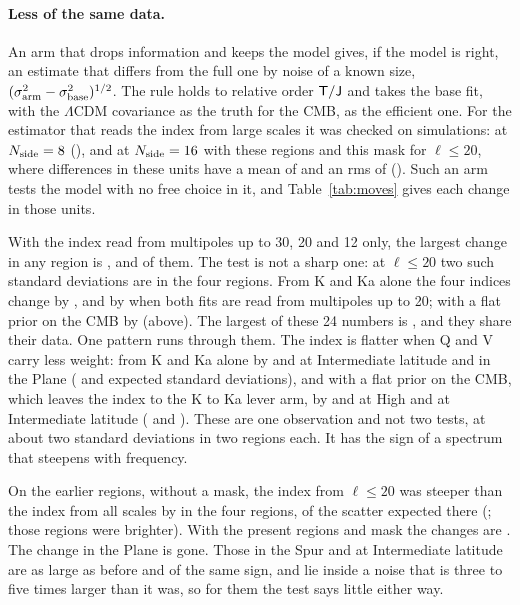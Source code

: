 \paragraph{Less of the same data.} An arm that drops information and keeps the model gives, if the
model is right, an estimate that differs from the full one by noise of a known size,
$(\sigma_{\rm arm}^2 - \sigma_{\rm base}^2)^{1/2}$. The rule holds to relative order $\mathsf{T}/\mathsf{J}$ and takes
the base fit, with the $\Lambda$CDM covariance as the truth for the CMB, as the efficient one. For
the estimator that reads the index from large scales it was checked on simulations: at
$N_{\rm side}=8$ (), and at $N_{\rm side}=16$ with these regions and this mask for
$\ell \le 20$, where  differences in these units have a mean of  and
an rms of  (). Such an arm tests the model with no free choice in it,
and Table~\ref{tab:moves} gives each change in those units.

With the index read from multipoles up to 30, 20 and 12 only, the largest change in any region is
,  and  of them. The test is not a sharp one: at
$\ell \le 20$ two such standard deviations are  in the four regions. From K and
Ka alone the four indices change by , and by  when both fits
are read from multipoles up to 20; with a flat prior on the CMB by  (above).
The largest of these 24 numbers is , and they share their data. One pattern runs
through them. The index is flatter when Q and V carry less weight: from K and Ka alone by
 and  at Intermediate latitude and in the Plane (
and  expected standard deviations), and with a flat prior on the CMB, which leaves
the index to the K to Ka lever arm, by  and  at High and at
Intermediate latitude ( and ). These are one observation and
not two tests, at about two standard deviations in two regions each. It has the sign of a spectrum
that steepens with frequency.

On the earlier regions, without a mask, the index from $\ell \le 20$ was steeper than the index
from all scales by  in the four regions,  of the
scatter expected there (; those regions were brighter). With the present
regions and mask the changes are . The change in the Plane is gone. Those in the
Spur and at Intermediate latitude are as large as before and of the same sign, and lie inside a
noise that is three to five times larger than it was, so for them the test says little either way.

